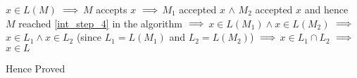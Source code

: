 \begin{enumerate}
\begin{enumerate}
$x \in L(M)$
$
\newline
\Longrightarrow
$
$M$ accepts $x$
$
\newline
\Longrightarrow
$
$M_1$ accepted $x$ $\land$ $M_2$ accepted $x$  \newline
and hence $M$ reached \ref{int_step_4} in the algorithm
$
\newline
\Longrightarrow
$
$x \in L(M_1) \land x \in L(M_2)$
$
\newline
\Longrightarrow
$
$x \in L_1 \land x \in L_2$ (since $L_1 = L(M_1)$ and $L_2 = L(M_2)$)
$
\newline
\Longrightarrow
$
$x \in L_1 \cap L_2$
$
\newline
\Longrightarrow
$
$x \in L$


    \end{enumerate}
    
Hence Proved








\end{enumerate}

